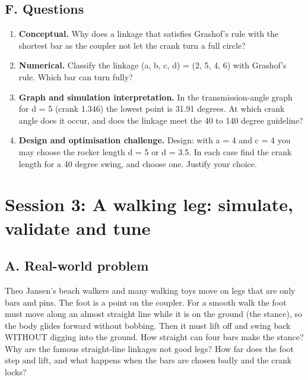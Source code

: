 \documentclass[11pt,a4paper]{article}
\begin{document}
\subsection*{F. Questions}
\begin{enumerate}[nosep]
\item \textbf{Conceptual.} Why does a linkage that satisfies Grashof's rule with the shortest bar as the coupler not let the crank turn a full circle?
\item \textbf{Numerical.} Classify the linkage (a, b, c, d) = (2, 5, 4, 6) with Grashof's rule. Which bar can turn fully?
\item \textbf{Graph and simulation interpretation.} In the transmission-angle graph for d = 5 (crank 1.346) the lowest point is 31.91 degrees. At which crank angle does it occur, and does the linkage meet the 40 to 140 degree guideline?
\item \textbf{Design and optimisation challenge.} Design: with a = 4 and c = 4 you may choose the rocker length d = 5 or d = 3.5. In each case find the crank length for a 40 degree swing, and choose one. Justify your choice.
\end{enumerate}

\section{Session 3: A walking leg: simulate, validate and tune}

\subsection*{A. Real-world problem}
Theo Jansen's beach walkers and many walking toys move on legs that are only bars and pins. The foot is a point on the coupler. For a smooth walk the foot must move along an almost straight line while it is on the ground (the stance), so the body glides forward without bobbing. Then it must lift off and swing back WITHOUT digging into the ground. How straight can four bars make the stance? Why are the famous straight-line linkages not good legs? How far does the foot step and lift, and what happens when the bars are chosen badly and the crank locks?
\end{document}
